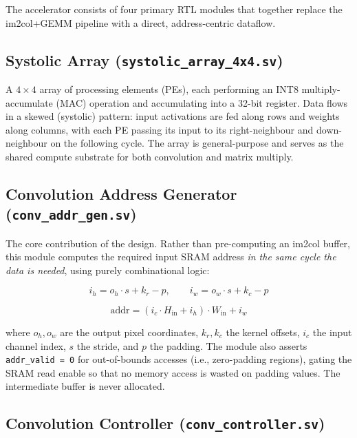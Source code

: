 \documentclass[11pt, letterpaper]{article}
\begin{document}
The accelerator consists of four primary RTL modules that together replace the
im2col+GEMM pipeline with a direct, address-centric dataflow.

\subsection{Systolic Array (\texttt{systolic\_array\_4x4.sv})}

A $4 \times 4$ array of processing elements (PEs), each performing an INT8
multiply-accumulate (MAC) operation and accumulating into a 32-bit register.
Data flows in a skewed (systolic) pattern: input activations are fed along
rows and weights along columns, with each PE passing its input to its
right-neighbour and down-neighbour on the following cycle. The array is
general-purpose and serves as the shared compute substrate for both
convolution and matrix multiply.

\subsection{Convolution Address Generator (\texttt{conv\_addr\_gen.sv})}

The core contribution of the design. Rather than pre-computing an im2col
buffer, this module computes the required input SRAM address \emph{in the
same cycle the data is needed}, using purely combinational logic:

\begin{equation}
  i_h = o_h \cdot s + k_r - p, \qquad
  i_w = o_w \cdot s + k_c - p
  \label{eq:coord}
\end{equation}

\begin{equation}
  \text{addr} = (i_c \cdot H_{\text{in}} + i_h) \cdot W_{\text{in}} + i_w
  \label{eq:addr}
\end{equation}

where $o_h, o_w$ are the output pixel coordinates, $k_r, k_c$ the kernel
offsets, $i_c$ the input channel index, $s$ the stride, and $p$ the padding.
The module also asserts \texttt{addr\_valid = 0} for out-of-bounds accesses
(i.e., zero-padding regions), gating the SRAM read enable so that no memory
access is wasted on padding values. The intermediate buffer is never
allocated.

\subsection{Convolution Controller (\texttt{conv\_controller.sv})}
\end{document}
